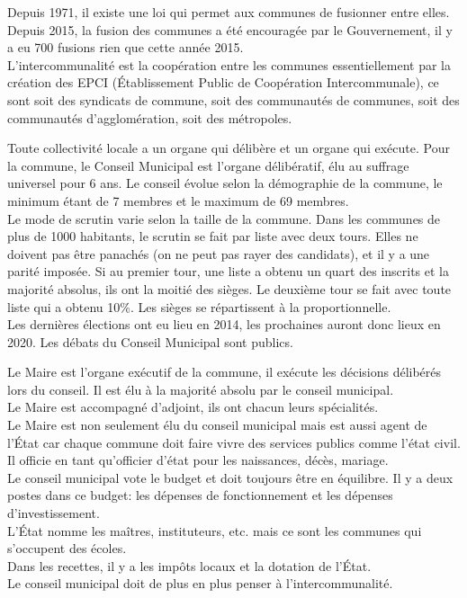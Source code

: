 \documentclass[12pt, a4paper, openany]{book}
\begin{document}
Depuis 1971, il existe une loi qui permet aux communes de fusionner entre elles. Depuis 2015, la fusion des communes a été encouragée par le Gouvernement, il y a eu 700 fusions rien que cette année 2015. \\
L'intercommunalité est la coopération entre les communes essentiellement par la création des EPCI (Établissement Public de Coopération Intercommunale), ce sont soit des syndicats de commune, soit des communautés de communes, soit des communautés d'agglomération, soit des métropoles. 


Toute collectivité locale a un organe qui délibère et un organe qui exécute. Pour la commune, le Conseil Municipal est l'organe délibératif, élu au suffrage universel pour 6 ans. Le conseil évolue selon la démographie de la commune, le minimum étant de 7 membres et le maximum de 69 membres. \\
Le mode de scrutin varie selon la taille de la commune. Dans les communes de plus de 1000 habitants, le scrutin se fait par liste avec deux tours. Elles ne doivent pas être panachés (on ne peut pas rayer des candidats), et il y a une parité imposée. Si au premier tour, une liste a obtenu un quart des inscrits et la majorité absolus, ils ont la moitié des sièges. Le deuxième tour se fait avec toute liste qui a obtenu 10\%. Les sièges se répartissent à la proportionnelle. \\
Les dernières élections ont eu lieu en 2014, les prochaines auront donc lieux en 2020. Les débats du Conseil Municipal sont publics. 


Le Maire est l'organe exécutif de la commune, il exécute les décisions délibérés lors du conseil. Il est élu à la majorité absolu par le conseil municipal. \\
Le Maire est accompagné d'adjoint, ils ont chacun leurs spécialités. \\
Le Maire est non seulement élu du conseil municipal mais est aussi agent de l'État car chaque commune doit faire vivre des services publics comme l'état civil. Il officie en tant qu'officier d'état pour les naissances, décès, mariage. \\
Le conseil municipal vote le budget et doit toujours être en équilibre. Il y a deux postes dans ce budget: les dépenses de fonctionnement et les dépenses d'investissement. \\
L'État nomme les maîtres, instituteurs, etc. mais ce sont les communes qui s'occupent des écoles. \\
Dans les recettes, il y a les impôts locaux et la dotation de l'État. \\
Le conseil municipal doit de plus en plus penser à l'intercommunalité.
\end{document}

